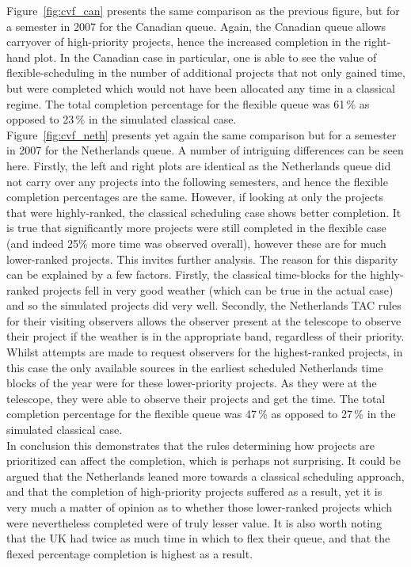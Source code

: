 \documentclass[]{spie}  %
\begin{document}
Figure~\ref{fig:cvf_can} presents the same comparison as the previous figure, but for a semester in 2007 for the Canadian queue. Again, the Canadian queue allows carryover of high-priority projects, hence the increased completion in the right-hand plot. In the Canadian case in particular, one is able to see the value of flexible-scheduling in the number of additional projects that not only gained time, but were completed which would not have been allocated any time in a classical regime. The total completion percentage for the flexible queue was 61\,\% as opposed to 23\,\% in the simulated classical case. \\

Figure~\ref{fig:cvf_neth} presents yet again the same comparison but for a semester in 2007 for the Netherlands queue. A number of intriguing differences can be seen here. Firstly, the left and right plots are identical as the Netherlands queue did not carry over any projects into the following semesters, and hence the flexible completion percentages are the same. However, if looking at only the projects that were highly-ranked, the classical scheduling case shows better completion. It is true that significantly more projects were still completed in the flexible case (and indeed 25\% more time was observed overall), however these are for much lower-ranked projects. This invites further analysis. The reason for this disparity can be explained by a few factors. Firstly, the classical time-blocks for the highly-ranked projects fell in very good weather (which can be true in the actual case) and so the simulated projects did very well. Secondly, the Netherlands TAC rules for their visiting observers allows the observer present at the telescope to observe their project if the weather is in the appropriate band, regardless of their priority. Whilst attempts are made to request observers for the highest-ranked projects, in this case the only available sources in the earliest scheduled Netherlands time blocks of the year were for these lower-priority projects. As they were at the telescope, they were able to observe their projects and get the time. The total completion percentage for the flexible queue was 47\,\% as opposed to 27\,\% in the simulated classical case.\\

In conclusion this demonstrates that the rules determining how projects are prioritized can affect the completion, which is perhaps not surprising. It could be argued that the Netherlands leaned more towards a classical scheduling approach, and that the completion of high-priority projects suffered as a result, yet it is very much a matter of opinion as to whether those lower-ranked projects which were nevertheless completed were of truly lesser value. It is also worth noting that the UK had twice as much time in which to flex their queue, and that the flexed percentage completion is highest as a result.\\
\end{document}
